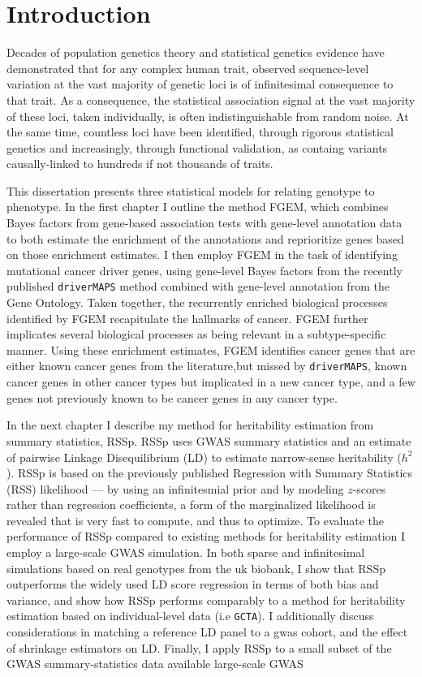 \chapter{Introduction}
\label{introduction}

Decades of population genetics theory and statistical genetics evidence have demonstrated that for any complex human trait, observed sequence-level variation at the vast majority of genetic loci is of infinitesimal consequence to that trait.  As a consequence, the statistical association signal at the vast majority of these loci, taken individually, is often indistinguishable from random noise.
At the same time, countless loci have been identified, through rigorous statistical genetics and increasingly, through functional validation, as containg variants causally-linked to hundreds if not thousands of traits.

This dissertation presents three statistical models for relating genotype to phenotype.  In the first chapter I outline the method FGEM, which combines Bayes factors from gene-based association tests with gene-level annotation data to both estimate the enrichment of the annotations and reprioritize genes based on those enrichment estimates.  I then employ FGEM in the task of identifying mutational cancer driver genes, using gene-level Bayes factors from the recently published \texttt{driverMAPS} method\cite{drivermaps} combined with gene-level annotation from the Gene Ontology\cite{GO}.  Taken together, the recurrently enriched biological processes identified by FGEM recapitulate the hallmarks of cancer\cite{Hanahan_2011}.  FGEM  further implicates several biological processes as being relevant in a subtype-specific manner.  Using these enrichment estimates, FGEM identifies cancer genes that are either known cancer genes from the literature,but missed by \texttt{driverMAPS}, known cancer genes in other cancer types but implicated in a new cancer type, and a few genes not previously known to be cancer genes in any cancer type.

In the next chapter I describe my method for heritability estimation from summary statistics, RSSp.
RSSp uses GWAS summary statistics and an estimate of pairwise Linkage Disequilibrium (LD) to estimate narrow-sense heritability ($h^2$).  RSSp is based on the previously published Regression with Summary Statistics (RSS) likelihood\cite{Zhu_2017} --- by using an infinitesmial prior and by modeling $z$-scores rather than regression coefficients, a form of the marginalized likelihood is revealed that is very fast to compute, and thus to optimize.  To evaluate the performance of RSSp compared to existing methods for heritability estimation I employ a large-scale GWAS simulation.  In both sparse and infinitesimal simulations based on real genotypes from the uk biobank, I show that RSSp outperforms the widely used LD score regression\cite{ldsc} in terms of both bias and variance, and show how RSSp performs comparably to a method for heritability estimation based on individual-level data (i.e \texttt{GCTA}).  I additionally discuss considerations in matching a reference LD panel to a gwas cohort, and the effect of shrinkage estimators on LD. Finally, I apply RSSp to a small subset of the GWAS summary-statistics data available large-scale GWAS 

